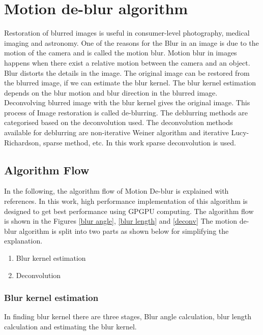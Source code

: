 \section{Motion de-blur algorithm \cite{BlurredImageRestoration} \cite{motionBlurEstimation}}
Restoration of blurred images is useful in consumer-level photography, medical imaging and astronomy. One of the reasons for the Blur in an image is due to the motion of the camera and is called the motion blur. Motion blur in images happens when there exist a relative motion between the camera and an object. Blur distorts the details in the image. The original image can be restored from the blurred image, if we can estimate the blur kernel. The blur kernel estimation depends on the blur motion and blur direction in the blurred image. Deconvolving blurred image with the blur kernel gives the original image. This process of Image restoration is called de-blurring. The deblurring methods are categorised based on the deconvolution used. The deconvolution methods available for deblurring are non-iterative Weiner algorithm \cite{BlurredImageRestoration} and iterative Lucy-Richardson, sparse method, etc. In this work sparse deconvolution is used.
\subsection{Algorithm Flow}
In the following, the algorithm flow of Motion De-blur is explained with references. In this work, high performance implementation of this algorithm is designed to get best performance using GPGPU computing. The algorithm flow is shown in the Figures \ref{blur angle}, \ref{blur length} and \ref{deconv} The motion de-blur algorithm is split into two parts as shown below for simplifying the explanation.
\begin{enumerate}
	\item Blur kernel estimation
	\item Deconvolution 
\end{enumerate}
\subsubsection{Blur kernel estimation}
In finding blur kernel there are three stages, Blur angle calculation, blur length calculation and estimating the blur kernel. 

